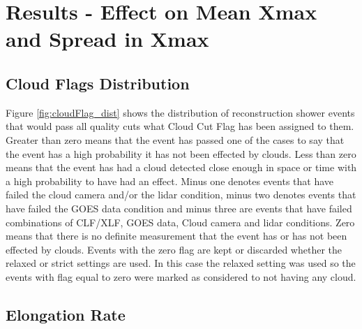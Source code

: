 \section{Results - Effect on Mean Xmax and Spread in Xmax}

%
%
%

\subsection{Cloud Flags Distribution}

Figure \ref{fig:cloudFlag_dist} shows the distribution of reconstruction shower events that would pass all quality cuts what Cloud Cut Flag has been assigned to them. Greater than zero means that the event has passed one of the cases to say that the event has a high probability it has not been effected by clouds. Less than zero means that the event has had a cloud detected close enough in space or time with a high probability to have had an effect. Minus one denotes events that have failed the cloud camera and/or the lidar condition, minus two denotes events that have failed the GOES data condition and minus three are events that have failed combinations of CLF/XLF, GOES data, Cloud camera and lidar conditions. Zero means that there is no definite measurement that the event has or has not been effected by clouds. Events with the zero flag are kept or discarded whether the relaxed or strict settings are used. In this case the relaxed setting was used so the events with flag equal to zero were marked as considered to not having any cloud.

\subsection{Elongation Rate}


